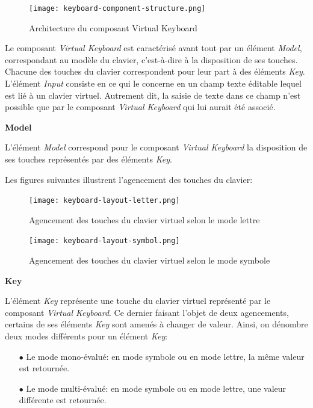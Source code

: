 \documentclass[11pt,a4paper,oldfontcommands]{memoir}
\begin{document}
\begin{figure}[H]
\centering
\texttt{[image: keyboard-component-structure.png]}
\caption{Architecture du composant Virtual Keyboard}
\end{figure}

Le composant \textit{Virtual Keyboard} est caractérisé avant tout par un élément \textit{Model}, correspondant au modèle du clavier, c'est-à-dire à la disposition de ses touches. Chacune des touches du clavier correspondent pour leur part à des éléments \textit{Key}. L'élément \textit{Input} consiste en ce qui le concerne en un champ texte éditable lequel est lié à un clavier virtuel. Autrement dit, la saisie de texte dans ce champ n'est possible que par le composant \textit{Virtual Keyboard} qui lui aurait été associé.

\textbf{Model}

L'élément \textit{Model} correspond pour le composant \textit{Virtual Keyboard} la disposition de ses touches représentés par des éléments \textit{Key}.

Les figures suivantes illustrent l'agencement des touches du clavier:

\begin{figure}[H]
\centering
\texttt{[image: keyboard-layout-letter.png]}
\caption{Agencement des touches du clavier virtuel selon le mode lettre}
\end{figure}

\begin{figure}[H]
\centering
\texttt{[image: keyboard-layout-symbol.png]}
\caption{Agencement des touches du clavier virtuel selon le mode symbole}
\end{figure}

\textbf{Key}

L'élément \textit{Key} représente une touche du clavier virtuel représenté par le composant \textit{Virtual Keyboard}. Ce dernier faisant l'objet de deux agencements, certains de ses éléments \textit{Key} sont amenés à changer de valeur. Ainsi, on dénombre deux modes différents pour un élément \textit{Key}:

\begin{itemize}
\item[$\bullet$] Le mode mono-évalué: en mode symbole ou en mode lettre, la même valeur est retournée.
\item[$\bullet$] Le mode multi-évalué: en mode symbole ou en mode lettre, une valeur différente est retournée.
\end{itemize}
\end{document}
